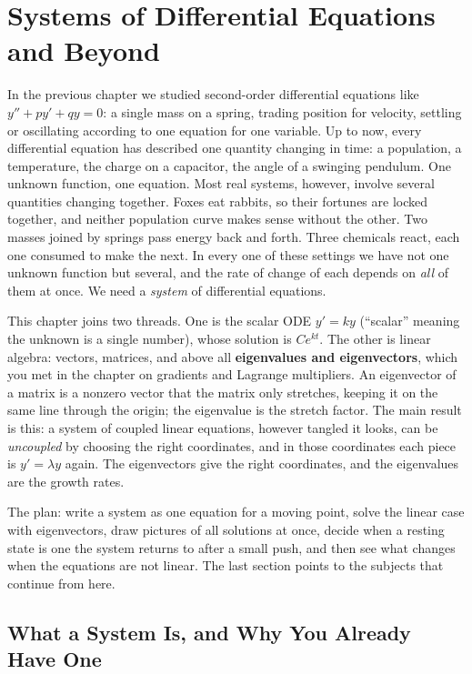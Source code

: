 \chapter{Systems of Differential Equations and Beyond}

In the previous chapter we studied second-order differential equations
like $y'' + py' + qy = 0$: a single mass on a spring, trading position for
velocity, settling or oscillating according to one equation for one variable. Up
to now, every differential equation has described one quantity changing in
time: a population, a temperature, the charge on a capacitor, the angle of a
swinging pendulum. One unknown function, one equation. Most real systems,
however, involve several quantities changing together. Foxes eat rabbits, so their fortunes are locked together, and neither population curve makes
sense without the other. Two masses joined
by springs pass energy back and forth. Three chemicals react, each one
consumed to make the next. In every one of these settings we have not one
unknown function but several, and the rate of change of each depends on
\emph{all} of them at once. We need a \emph{system} of differential equations.

This chapter joins two threads. One is the scalar ODE $y' = ky$
(``scalar'' meaning the unknown is a single number), whose solution is
$Ce^{kt}$. The other is linear algebra: vectors, matrices, and above all
\textbf{eigenvalues and eigenvectors}, which you met in the chapter on
gradients and Lagrange multipliers. An eigenvector of a matrix is a nonzero
vector that the matrix only stretches, keeping it on the same line through the
origin; the eigenvalue is the stretch factor. The main result is this: a system
of coupled linear equations, however tangled it looks, can be \emph{uncoupled}
by choosing the right coordinates, and in those coordinates each piece is
$y'=\lambda y$ again. The eigenvectors give the right coordinates, and the
eigenvalues are the growth rates.

The plan: write a system as one equation for a moving point, solve the linear
case with eigenvectors, draw pictures of all solutions at once, decide when a
resting state is one the system returns to after a small push, and then see
what changes when the equations are not linear. The last section points to the
subjects that continue from here.

\chapterline

\section{What a System Is, and Why You Already Have One}
\label{ch39:what}

